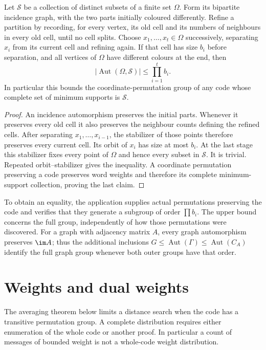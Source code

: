 \begin{theorem}\label{ULCD.Refinement}
Let $\mathcal S$ be a collection of distinct subsets of a finite set
$\Omega$. Form its bipartite incidence graph, with the two parts initially
coloured differently. Refine a partition by recording, for every vertex,
its old cell and its numbers of neighbours in every old cell, until no
cell splits. Choose $x_1,\ldots,x_t\in\Omega$ successively, separating
$x_i$ from its current cell and refining again. If that cell has size $b_i$
before separation, and all vertices of $\Omega$ have different colours
at the end, then
\[
 |\operatorname{Aut}(\Omega,\mathcal S)|\leq\prod_{i=1}^t b_i.
\]
In particular this bounds the coordinate-permutation group of any code
whose complete set of minimum supports is $\mathcal S$.
\end{theorem}
\begin{proof}
An incidence automorphism preserves the initial parts. Whenever it
preserves every old cell it also preserves the neighbour counts defining
the refined cells. After separating $x_1,\ldots,x_{i-1}$, the stabilizer
of those points therefore preserves every current cell. Its orbit of
$x_i$ has size at most $b_i$. At the last stage this stabilizer fixes
every point of $\Omega$ and hence every subset in $\mathcal S$.
It is trivial. Repeated orbit--stabilizer gives the inequality.
A coordinate permutation preserving a code preserves word weights and
therefore its complete minimum-support collection, proving the last claim.
\end{proof}

To obtain an equality, the application supplies actual permutations
preserving the code and verifies that they generate a subgroup of order
$\prod b_i$. The upper bound concerns the full group, independently of
how those permutations were discovered. For a graph with adjacency matrix
$A$, every graph automorphism preserves $\im A$; thus the additional
inclusions $G\leq\operatorname{Aut}(\Gamma)\leq\operatorname{Aut}(C_A)$
identify the full graph group whenever both outer groups have that order.

\section{Weights and dual weights}

The averaging theorem below limits a distance search when the code has
a transitive permutation group. A complete distribution requires either
enumeration of the whole code or another proof. In particular a count of
messages of bounded weight is not a whole-code weight distribution.


